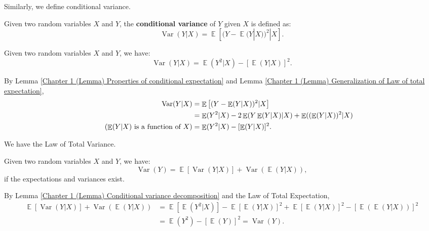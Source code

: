 \documentclass{huhtakm-template-book-v2}
\DeclareMathOperator{\E}{\mathbb{E}}
\DeclareMathOperator{\Var}{Var}
\begin{document}
    Similarly, we define conditional variance.
    \begin{defn}
        Given two random variables $X$ and $Y$, the \textbf{conditional variance} of $Y$ given $X$ is defined as:
        \begin{equation*}
            \Var(Y | X) = \E\left[(Y - \E(Y | X))^{2} | X\right].
        \end{equation*}
    \end{defn}
    \begin{lem}
        \label{Chapter 1 (Lemma) Conditional variance decomposition}
        Given two random variables $X$ and $Y$, we have:
        \begin{equation*}
            \Var(Y | X) = \E(Y^{2} | X) - [\E(Y | X)]^{2}.
        \end{equation*}
    \end{lem}
    \begin{proofing}
        By Lemma \ref{Chapter 1 (Lemma) Properties of conditional expectation} and Lemma \ref{Chapter 1 (Lemma) Generalization of Law of total expectation},
        \begin{align*}
            \Var(Y | X) &= \E\left[(Y - \E(Y | X))^{2} | X\right] \\
            &= \E(Y^{2} | X) - 2\E(Y\E(Y | X) | X) + \E((\E(Y | X))^{2} | X) \\
            \tag{$\E(Y | X)$ is a function of $X$}
            &= \E(Y^{2} | X) - [\E(Y | X)]^{2}.
        \end{align*}
    \end{proofing}
    We have the Law of Total Variance.
    \begin{thm}
        Given two random variables $X$ and $Y$, we have:
        \begin{equation*}
            \Var(Y) = \E[\Var(Y | X)] + \Var(\E(Y | X)),
        \end{equation*}
        if the expectations and variances exist.
    \end{thm}
    \begin{proofing}
        By Lemma \ref{Chapter 1 (Lemma) Conditional variance decomposition} and the Law of Total Expectation,
        \begin{align*}
            \E[\Var(Y | X)] + \Var(\E(Y | X)) &= \E[\E(Y^{2} | X)] - \E[\E(Y | X)]^{2} + \E[\E(Y | X)]^{2} - \left[\E(\E(Y | X))\right]^{2} \\
            &= \E(Y^{2}) - [\E(Y)]^{2} = \Var(Y).
        \end{align*}
    \end{proofing}
\end{document}
